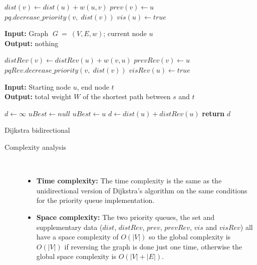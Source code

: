 \documentclass{article}
\begin{document}
\begin{algorithm}
\begin{minipage}[t]{0.49\textwidth}
\begin{algorithmic}[1]
                \State $dist(v)\gets dist(u) + w(u,v)$
                \State $prev(v)\gets u$
                \State $pq.decrease\_priority(v,\;dist(v))$
            \EndIf
        \EndFor
        \State $vis(u)\gets true$
    \EndFunction
\end{algorithmic}
\textbf{Input:} Graph $\;G\:=\:(V, E,w)$; current node $u$\\
\textbf{Output:} nothing
\begin{algorithmic}[1]
                \State $distRev(v)\gets distRev(u) + w(v,u)$
                \State $prevRev(v)\gets u$
                \State $pqRev.decrease\_priority(v,\;dist(v))$
            \EndIf
        \EndFor
        \State $visRev(u)\gets true$
    \EndFunction
\end{algorithmic}
\textbf{Input:} Starting node $u$, end node $t$\\
\textbf{Output:} total weight $W$ of the shortest path between $s$ and $t$
\begin{algorithmic}[1]
        \State $d\gets\infty$
        \State $uBest \gets null$
                \State $uBest \gets u$
                \State $d \gets dist(u)+distRev(u)$
            \EndIf
        \EndFor
        \State \textbf{return} $d$
    \EndFunction
\end{algorithmic}
\end{minipage}
\caption{Dijkstra bidirectional}
\end{algorithm}
\begin{description}
\item[Complexity analysis]\
\begin{itemize}
    \item \textbf{Time complexity:} The time complexity is the same as the unidirectional version of Dijkstra's algorithm on the same conditions for the priority queue implementation.
    \item \textbf{Space complexity:} The two priority queues, the set and supplementary data ($dist$, $distRev$, $prev$, $prevRev$, $vis$ and $visRev$) all have a space complexity of $O(|V|)$ so the global complexity is $O(|V|)$ if reversing the graph is done just one time, otherwise the global space complexity is $O(|V|+|E|)$.
\end{itemize}
\end{description}
\newpage
\end{document}
